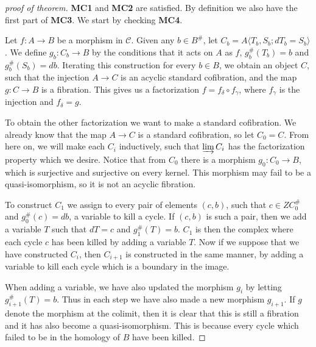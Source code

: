 \documentclass[../thesis.tex]{subfiles}
\begin{document}
            \begin{proof}[proof of theorem]
                \textbf{MC1} and \textbf{MC2} are satisfied. By definition we also have the first part of \textbf{MC3}. We start by checking \textbf{MC4}.

                Let $f:A\rightarrow B$ be a morphism in $\mathcal{C}$. Given any $b\in B^\#$, let $C_b = A\langle T_b,S_b; dT_b = S_b\rangle$. We define $g_b: C_b \rightarrow B$ by the conditions that it acts on $A$ as $f$, $g_b^\#(T_b) = b$ and $g_b^\#(S_b)=db$. Iterating this construction for every $b\in B$, we obtain an object $C$, such that the injection $A \rightarrow C$ is an acyclic standard cofibration, and the map $g : C \rightarrow B$ is a fibration. This gives us a factorization $f = f_\delta\circ f_\gamma$, where $f_\gamma$ is the injection and $f_\delta = g$.

                To obtain the other factorization we want to make a standard cofibration. We already know that the map $A\rightarrow C$ is a standard cofibration, so let $C_0 = C$. From here on, we will make each $C_i$ inductively, such that $\varinjlim C_i$ has the factorization property which we desire. Notice that from $C_0$ there is a morphism $g_0 : C_0 \rightarrow B$, which is surjective and surjective on every kernel. This morphism may fail to be a quasi-isomorphism, so it is not an acyclic fibration.
                
                To construct $C_1$ we assign to every pair of elements $(c,b)$, such that $c\in ZC_0^\#$ and $g_0^\#(c) = db$, a variable to kill a cycle. If $(c,b)$ is such a pair, then we add a variable $T$ such that $dT = c$ and $g_1^\#(T)=b$. $C_1$ is then the complex where each cycle $c$ has been killed by adding a variable $T$. Now if we suppose that we have constructed $C_i$, then $C_{i+1}$ is constructed in the same manner, by adding a variable to kill each cycle which is a boundary in the image.

                When adding a variable, we have also updated the morphism $g_i$ by letting $g_{i+1}^\#(T) = b$. Thus in each step we have also made a new morphism $g_{i+1}$. If $g$ denote the morphism at the colimit, then it is clear that this is still a fibration and it has also become a quasi-isomorphism. This is because every cycle which failed to be in the homology of $B$ have been killed. 
                

\end{proof}
\end{document}
